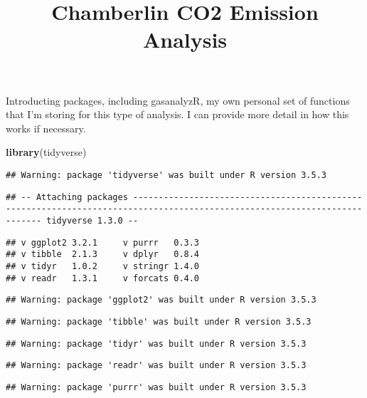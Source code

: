 \documentclass[]{article}
\title{Chamberlin CO2 Emission Analysis}
\author{}
\date{}
\newenvironment{Shaded}{\begin{snugshade}}{\end{snugshade}}
\newcommand{\KeywordTok}[1]{\textcolor[rgb]{0.13,0.29,0.53}{\textbf{#1}}}
\newcommand{\NormalTok}[1]{#1}
\begin{document}
\maketitle

Introducting packages, including gasanalyzR, my own personal set of
functions that I'm storing for this type of analysis. I can provide more
detail in how this works if necessary.

\begin{Shaded}
\begin{Highlighting}[]
\KeywordTok{library}\NormalTok{(tidyverse)}
\end{Highlighting}
\end{Shaded}

\begin{verbatim}
## Warning: package 'tidyverse' was built under R version 3.5.3
\end{verbatim}

\begin{verbatim}
## -- Attaching packages -------------------------------------------------------------------------------------------------------------------------- tidyverse 1.3.0 --
\end{verbatim}

\begin{verbatim}
## v ggplot2 3.2.1     v purrr   0.3.3
## v tibble  2.1.3     v dplyr   0.8.4
## v tidyr   1.0.2     v stringr 1.4.0
## v readr   1.3.1     v forcats 0.4.0
\end{verbatim}

\begin{verbatim}
## Warning: package 'ggplot2' was built under R version 3.5.3
\end{verbatim}

\begin{verbatim}
## Warning: package 'tibble' was built under R version 3.5.3
\end{verbatim}

\begin{verbatim}
## Warning: package 'tidyr' was built under R version 3.5.3
\end{verbatim}

\begin{verbatim}
## Warning: package 'readr' was built under R version 3.5.3
\end{verbatim}

\begin{verbatim}
## Warning: package 'purrr' was built under R version 3.5.3
\end{verbatim}
\end{document}
